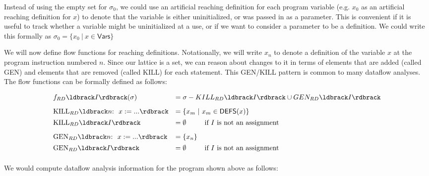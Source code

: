 \documentclass[11pt]{article}
\begin{document}

Instead of using the empty set for $\sigma_0$, we could use an artificial reaching definition for each program variable (e.g. $x_0$ as an artificial reaching definition for $x$) to denote that the variable is either uninitialized, or was passed in as a parameter.  This is convenient if it is useful to track whether a variable might be uninitialized at a use, or if we want to consider a parameter to be a definition.  We could write this formally as $\sigma_0 = \{ x_0 ~|~ x \in \textsf{Vars} \}$


We will now define flow functions for reaching definitions.  Notationally, we will write $x_n$ to denote a definition of the variable $x$ at the program instruction numbered $n$.  Since our lattice is a set, we can reason about changes to it in terms of elements that are added (called GEN) and elements that are removed (called KILL) for each statement.  This GEN/KILL pattern is common to many dataflow analyses.  The flow functions can be formally defined as follows:

\[
\begin{array}{lll}

f_{RD}\parg{I}(\sigma) & = \sigma - KILL_{RD}\parg{I} \union GEN_{RD}\parg{I}\\[2ex]

\mbox{KILL}_{RD}\parg{n{:}~~ x := ...} & = \{ x_m ~|~ x_m \in \textsf{DEFS}(x) \}\\[1ex]
\mbox{KILL}_{RD}\parg{I} & = \emptyset ~~~~~~~~ \mbox{if $I$ is not an assignment}\\[2ex]

\mbox{GEN}_{RD}\parg{n{:}~~ x := ...} & = \{ x_n \}\\[1ex]
\mbox{GEN}_{RD}\parg{I}  & = \emptyset ~~~~~~~~ \mbox{if $I$ is not an assignment}\\[1ex]

\end{array}
\]

We would compute dataflow analysis information for the program shown above as follows:
\end{document}
